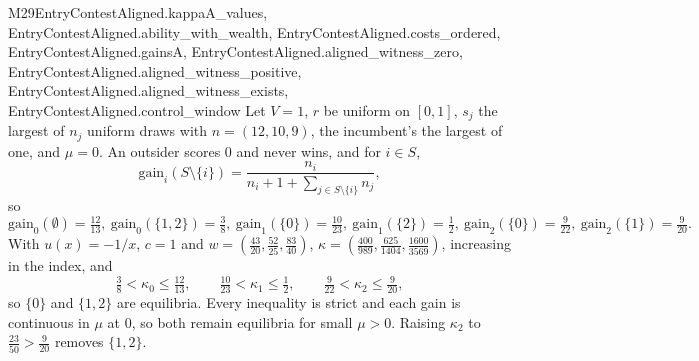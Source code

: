 \begin{mproof}{M29}{EntryContestAligned.kappaA_values, EntryContestAligned.ability_with_wealth, EntryContestAligned.costs_ordered, EntryContestAligned.gainsA, EntryContestAligned.aligned_witness_zero, EntryContestAligned.aligned_witness_positive, EntryContestAligned.aligned_witness_exists, EntryContestAligned.control_window}
Let $V=1$, $r$ be uniform on $[0,1]$, $s_j$ the largest of $n_j$ uniform draws
with $n=(12,10,9)$, the incumbent's the largest of one, and $\mu=0$. An outsider scores $0$ and never
wins, and for $i\in S$,
\[
  \mathrm{gain}_i(S\setminus\{i\})=\frac{n_i}{n_i+1+\sum_{j\in S\setminus\{i\}}n_j},
\]
so
\[
  \mathrm{gain}_0(\emptyset)=\tfrac{12}{13},\ \mathrm{gain}_0(\{1,2\})=\tfrac38,\
  \mathrm{gain}_1(\{0\})=\tfrac{10}{23},\ \mathrm{gain}_1(\{2\})=\tfrac12,\
  \mathrm{gain}_2(\{0\})=\tfrac9{22},\ \mathrm{gain}_2(\{1\})=\tfrac9{20}.
\]
With $u(x)=-1/x$, $c=1$ and $w=(\frac{43}{20},\frac{52}{25},\frac{83}{40})$,
$\kappa=(\frac{400}{989},\frac{625}{1404},\frac{1600}{3569})$, increasing in
the index, and
\[
  \tfrac38<\kappa_0\le\tfrac{12}{13},\qquad
  \tfrac{10}{23}<\kappa_1\le\tfrac12,\qquad
  \tfrac9{22}<\kappa_2\le\tfrac9{20},
\]
so $\{0\}$ and $\{1,2\}$ are equilibria. Every inequality is strict and each
gain is continuous in $\mu$ at $0$, so both remain equilibria for small
$\mu>0$. Raising $\kappa_2$ to $\frac{23}{50}>\frac9{20}$ removes $\{1,2\}$.
\end{mproof}

